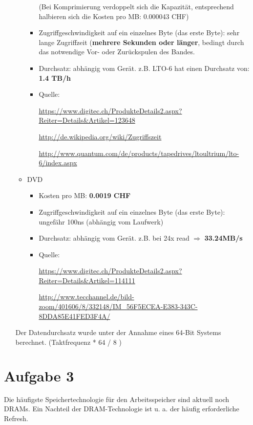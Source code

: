 \documentclass[10pt]{article}
\begin{document}
\begin{enumerate}[label=\alph*)]
\begin{itemize}
\begin{itemize}
						(Bei Komprimierung verdoppelt sich die Kapazität, entsprechend halbieren sich die Kosten pro MB: 0.000043 CHF)
						
						\item Zugriffgeschwindigkeit auf ein einzelnes Byte (das erste Byte): sehr lange Zugriffzeit (\textbf{mehrere Sekunden oder länger}, bedingt durch das notwendige Vor- oder Zurückspulen des Bandes. 
						
						\item Durchsatz: abhängig vom Gerät.
						z.B. LTO-6 hat einen Durchsatz von: \textbf{1.4 TB/h}
						
						\item Quelle:
						
							\url{https://www.digitec.ch/ProdukteDetails2.aspx?Reiter=Details&Artikel=123648}
							
							\url{http://de.wikipedia.org/wiki/Zugriffszeit}
						
							\url{http://www.quantum.com/de/products/tapedrives/ltoultrium/lto-6/index.aspx}
						
					\end{itemize}
					
				\item DVD
					\begin{itemize}
						\item Kosten pro MB: \textbf{0.0019 CHF}
						
						\item Zugriffgeschwindigkeit auf ein einzelnes Byte (das erste Byte): ungefähr 100ns (abhängig vom Laufwerk)
						
						\item Durchsatz: abhängig vom Gerät. z.B. bei 24x read $\Rightarrow$ \textbf{33.24MB/s}
						
						\item Quelle:
							
							\url{https://www.digitec.ch/ProdukteDetails2.aspx?Reiter=Details&Artikel=114111}
							
							\url{http://www.tecchannel.de/bild-zoom/401606/8/332148/IM_56F5ECEA-E383-343C-8DDA85E41FED3F4A/}
					\end{itemize}
			\end{itemize}	
			Der Datendurchsatz wurde unter der Annahme eines 64-Bit Systems berechnet. (Taktfrequenz * 64 / 8 )

\end{enumerate}

\newpage
\section*{Aufgabe 3}
Die häufigste Speichertechnologie für den Arbeitsspeicher sind aktuell noch DRAMs. Ein Nachteil der DRAM-Technologie ist u. a. der häufig erforderliche Refresh.
\end{document}
